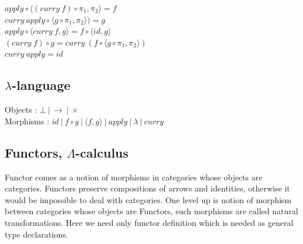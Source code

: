 \documentclass[11pt,oneside]{article}
\begin{document}
\begingroup
\parbox[t][][l]{0.40\textwidth}{

\begin{prooftree}
\end{prooftree}

\begin{prooftree}
\end{prooftree}

\begin{prooftree}
\end{prooftree}

}
\hspace{0.1cm}
\parbox[t][][r]{0.60\textwidth}{

\begin{center}
$apply \circ \langle (curry\ f) \circ \pi_1 , \pi_2 \rangle = f$\\
$curry\ apply \circ \langle g \circ \pi_1, \pi_2 \rangle) = g$\\
$apply \circ \langle curry\ f, g \rangle = f \circ \langle id , g\rangle$\\
$(curry\ f) \circ g = curry\ (f \circ \langle g \circ \pi_1,\pi_2\rangle)$\\
$curry\ apply = id$\\
\end{center}


}
\endgroup

\subsection*{$\lambda$-language}

\begin{center}
Objects : $\bot\ |\ \rightarrow\ |\ \times$\\
Morphisms : $id\ |\ f \circ g\ |\ \langle f, g \rangle\ |\ apply\ |\ \lambda\ |\ curry$
\end{center}

  \subsection{Functors, $\Lambda$-calculus}

  Functor comes as a notion of morphisms in categories whose objects are categories.
  Functors preserve compositions of arrows and identities, otherwise it would
  be impossible to deal with categories. One level up is notion of morphism between categories whose
  objects are Functors, such morphisms are called natural transformations. Here we need
  only functor definition which is needed as general type declarations.
\end{document}
